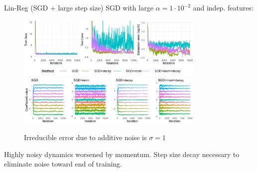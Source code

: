 \documentclass[11pt,compress,t,notes=noshow, xcolor=table]{beamer}
\begin{document}
\begin{vbframe}{Lin-Reg (SGD + large step size)}
\vspace{-0.4cm}
SGD with large $\alpha=1 \cdot 10^{-2}$ and indep. features:
\begin{figure}
            \includegraphics[width=0.8\textwidth]{slides/04-multivariate-first-order/figure_man/simu_linmod/SGD_reg_large_lr_iters.pdf} \\
             \includegraphics[width=0.8\textwidth]{slides/04-multivariate-first-order/figure_man/simu_linmod/SGD_reg_coef_large.pdf}\\
            \begin{footnotesize}
                Irreducible error due to additive noise is $\sigma=1$
            \end{footnotesize}
\end{figure}
Highly noisy dynamics worsened by momentum. Step size decay necessary to eliminate noise toward end of training.
\end{vbframe}
\end{document}
